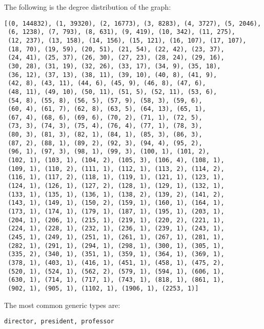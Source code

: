 \documentclass{tufte-handout}
\begin{document}
\begin{enumerate}
The following is the degree distribution of the graph:
\begin{verbatim}
[(0, 144832), (1, 39320), (2, 16773), (3, 8283), (4, 3727), (5, 2046),
 (6, 1238), (7, 793), (8, 631), (9, 419), (10, 342), (11, 275),
 (12, 237), (13, 158), (14, 156), (15, 121), (16, 107), (17, 107),
 (18, 70), (19, 59), (20, 51), (21, 54), (22, 42), (23, 37),
 (24, 41), (25, 37), (26, 30), (27, 23), (28, 24), (29, 16),
 (30, 28), (31, 19), (32, 26), (33, 17), (34, 9), (35, 18),
 (36, 12), (37, 13), (38, 11), (39, 10), (40, 8), (41, 9),
 (42, 8), (43, 11), (44, 6), (45, 9), (46, 8), (47, 6),
 (48, 11), (49, 10), (50, 11), (51, 5), (52, 11), (53, 6),
 (54, 8), (55, 8), (56, 5), (57, 9), (58, 3), (59, 6),
 (60, 4), (61, 7), (62, 8), (63, 5), (64, 13), (65, 1),
 (67, 4), (68, 6), (69, 6), (70, 2), (71, 1), (72, 5),
 (73, 3), (74, 3), (75, 4), (76, 4), (77, 1), (78, 3),
 (80, 3), (81, 3), (82, 1), (84, 1), (85, 3), (86, 3),
 (87, 2), (88, 1), (89, 2), (92, 3), (94, 4), (95, 2),
 (96, 1), (97, 3), (98, 1), (99, 3), (100, 1), (101, 2),
 (102, 1), (103, 1), (104, 2), (105, 3), (106, 4), (108, 1),
 (109, 1), (110, 2), (111, 1), (112, 1), (113, 2), (114, 2),
 (116, 1), (117, 2), (118, 1), (119, 1), (121, 1), (123, 1),
 (124, 1), (126, 1), (127, 2), (128, 1), (129, 1), (132, 1),
 (133, 1), (135, 1), (136, 1), (138, 2), (139, 2), (141, 2),
 (143, 1), (149, 1), (150, 2), (159, 1), (160, 1), (164, 1),
 (173, 1), (174, 1), (179, 1), (187, 1), (195, 1), (203, 1),
 (204, 1), (206, 1), (215, 1), (219, 1), (220, 2), (221, 1),
 (224, 1), (228, 1), (232, 1), (236, 1), (239, 1), (243, 1),
 (245, 1), (249, 1), (251, 1), (261, 1), (267, 1), (281, 1),
 (282, 1), (291, 1), (294, 1), (298, 1), (300, 1), (305, 1),
 (335, 2), (340, 1), (351, 1), (359, 1), (364, 1), (369, 1),
 (378, 1), (403, 1), (416, 1), (451, 1), (458, 1), (475, 2),
 (520, 1), (524, 1), (562, 2), (579, 1), (594, 1), (606, 1),
 (630, 1), (714, 1), (717, 1), (743, 1), (818, 1), (861, 1),
 (902, 1), (905, 1), (1102, 1), (1906, 1), (2253, 1)]
\end{verbatim}

The most common generic types are:
\begin{verbatim}
director, president, professor
\end{verbatim}


\end{enumerate}
\end{document}
